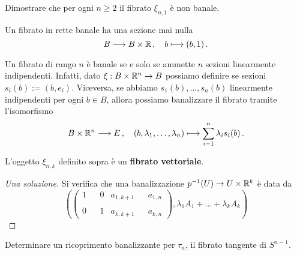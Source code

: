 \begin{exercise}
	Dimostrare che per ogni $n \ge 2$ il fibrato $\xi_{n,1}$ è non banale.
\end{exercise}

\begin{ex}
	Un fibrato in rette banale ha una sezione mai nulla
	\begin{equation*}
		B \longrightarrow B \times {\mathbb R}\,,
		\quad b \longmapsto (b,1)\,.
	\end{equation*}
\end{ex}

\begin{oss}
	Un fibrato di rango $n$ è banale se e solo se ammette
	$n$ sezioni linearmente indipendenti.
	Infatti, dato $\xi:B \times {\mathbb R}^{n} \to B$ possiamo definire
	se sezioni $s_{i}(b) := (b, e_{i})$. Viceversa,
	se abbiamo $s_{1}(b), \dots, s_{n}(b)$ linearmente indipendenti per ogni $b \in B$,
	allora possiamo banalizzare il fibrato tramite l'isomorfismo
	\begin{equation*}
		B \times {\mathbb R}^{n} \longrightarrow E\,,
		\quad (b, \lambda_{1}, \dots, \lambda_{n}) \longmapsto \sum_{i=1}^{n}\lambda_{i}s_{i}(b)\,.
	\end{equation*}
\end{oss}

\begin{exercise}
	L'oggetto $\xi_{n,k}$ definito sopra è un \textbf{fibrato vettoriale}.
	\begin{proof}[Una soluzione]
		Si verifica che una banalizzazione $p^{-1}(U) \to U \times {\mathbb R}^{k}$ è data da
		\begin{equation*}
			\left( 
				\begin{pmatrix}
					1 & & 0 & a_{1,k+1} & & a_{1,n} \\
					& & & & & \\
					0 & & 1 & a_{k,k+1} & & a_{k,n}
				\end{pmatrix},
				\lambda_{1}A_{1} + \dots + \lambda_{k}A_{k}
			\right)
		\end{equation*}
	\end{proof}
\end{exercise}

\begin{exercise}
	Determinare un ricoprimento banalizzante per $\tau_{n}$, 
	il fibrato tangente di $S^{n-1}$.
\end{exercise}

